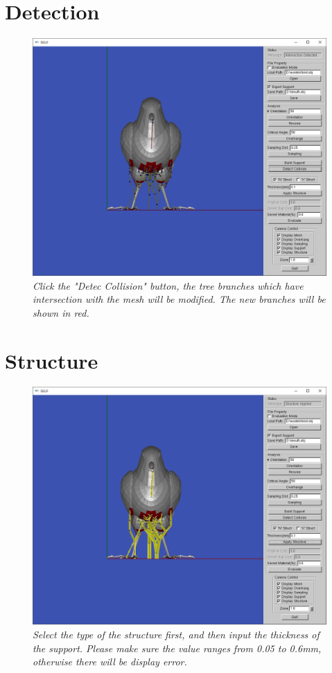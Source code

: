 \documentclass[11pt, a4paper]{article}
\begin{document}
	\section{Detection}
	\begin{figure}[H]
  		\centering
      	\includegraphics[width=1.0\textwidth]{collision.png}
  	\caption{\textit{Click the "Detec Collision" button, the tree branches which have intersection with the mesh will be modified. The new branches will be shown in red.}}
	\end{figure}
	\section{Structure}
	\begin{figure}[H]
  		\centering
      	\includegraphics[width=1.0\textwidth]{structure.png}
  	\caption{\textit{Select the type of the structure first, and then input the thickness of the support. Please make sure the value ranges from 0.05 to 0.6mm, otherwise there will be display error.}}
	\end{figure}
\end{document}
